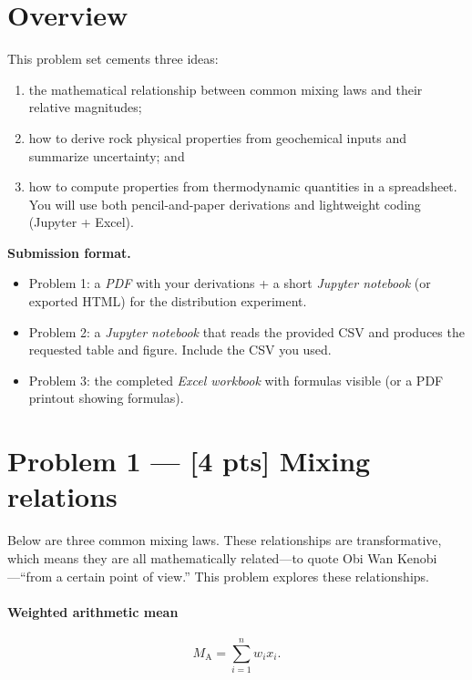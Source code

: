 \documentclass[11pt,a4paper]{article}
\newcommand{\arith}{\mathrm{A}}
\begin{document}
\maketitle

\section*{Overview}
This problem set cements three ideas:
\begin{enumerate}
  \item the mathematical relationship between common mixing laws and their relative magnitudes;
  \item how to derive rock physical properties from geochemical inputs and summarize uncertainty; and
  \item how to compute properties from thermodynamic quantities in a spreadsheet. You will use both pencil-and-paper derivations and lightweight coding (Jupyter + Excel).
\end{enumerate}

\vspace{0.5em}
\noindent\textbf{Submission format.}
\begin{itemize}[leftmargin=*]
  \item Problem 1: a \emph{PDF} with your derivations + a short \emph{Jupyter notebook} (or exported HTML) for the distribution experiment.
  \item Problem 2: a \emph{Jupyter notebook} that reads the provided CSV and produces the requested table and figure. Include the CSV you used.
  \item Problem 3: the completed \emph{Excel workbook} with formulas visible (or a PDF printout showing formulas).
\end{itemize}

\section*{Problem 1 --- [4 pts] Mixing relations}
Below are three common mixing laws.  These relationships are transformative, which means they are all mathematically related---to quote Obi Wan Kenobi---``from a certain point of view.''  This problem explores these relationships.
\paragraph{Weighted arithmetic mean}
\[
    M_{\arith} = \sum_{i=1}^n w_i x_i.
\]
\end{document}

